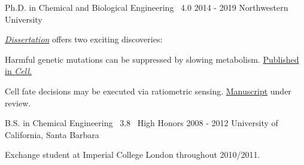 

\begin{cventries}

  \cventrynew
	{Ph.D. in Chemical and Biological Engineering \bullet\ 4.0} %
	{2014 - 2019} %
	{Northwestern University} %
    {\href{https://search.proquest.com/openview/75781af182db5bcf643756c762aa4ff4/1?pq-origsite=gscholar&cbl=18750&diss=y}
      	   {\emph{Dissertation}} offers two exciting discoveries: \newline
      \vspace{4.0mm}
      \begin{cvitems} 
      	\item {Harmful genetic mutations can be suppressed by slowing metabolism. \href{https://doi.org/10.1016/j.cell.2019.06.023}{Published in \emph{Cell}.}}
		 \item {Cell fate decisions may be executed via ratiometric sensing. \href{https://doi.org/10.1101/430744}{Manuscript} under review.} 
      \end{cvitems}      	  
    }
    
  \cventrynew
	{B.S. in Chemical Engineering \bullet\ 3.8 \bullet\ High Honors} 	
	{2008 - 2012} 	
	{University of California, Santa Barbara}    
    {
      \begin{cvitems} %
      	\item {Exchange student at Imperial College London throughout 2010/2011.}      	
      \end{cvitems}
    }

\end{cventries}
